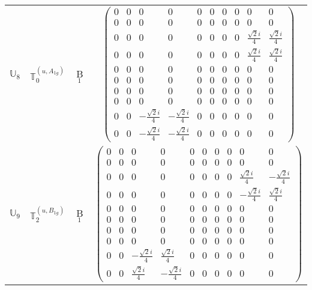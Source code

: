 \documentclass[fleqn,10pt,landscape]{article}
\begin{document}
\begin{itemize}
\begin{center}
\begin{longtable}{c|c|c|c}
$ \mathbb{U}_{8} $ & $\mathbb{T}_{0}^{(u,A_{1g})}$ & B$_{1}$ & $\begin{pmatrix} 0 & 0 & 0 & 0 & 0 & 0 & 0 & 0 & 0 & 0 \\ 0 & 0 & 0 & 0 & 0 & 0 & 0 & 0 & 0 & 0 \\ 0 & 0 & 0 & 0 & 0 & 0 & 0 & 0 & \frac{\sqrt{2} i}{4} & \frac{\sqrt{2} i}{4} \\ 0 & 0 & 0 & 0 & 0 & 0 & 0 & 0 & \frac{\sqrt{2} i}{4} & \frac{\sqrt{2} i}{4} \\ 0 & 0 & 0 & 0 & 0 & 0 & 0 & 0 & 0 & 0 \\ 0 & 0 & 0 & 0 & 0 & 0 & 0 & 0 & 0 & 0 \\ 0 & 0 & 0 & 0 & 0 & 0 & 0 & 0 & 0 & 0 \\ 0 & 0 & 0 & 0 & 0 & 0 & 0 & 0 & 0 & 0 \\ 0 & 0 & - \frac{\sqrt{2} i}{4} & - \frac{\sqrt{2} i}{4} & 0 & 0 & 0 & 0 & 0 & 0 \\ 0 & 0 & - \frac{\sqrt{2} i}{4} & - \frac{\sqrt{2} i}{4} & 0 & 0 & 0 & 0 & 0 & 0 \end{pmatrix}$ \\
$ \mathbb{U}_{9} $ & $\mathbb{T}_{2}^{(u,B_{1g})}$ & B$_{1}$ & $\begin{pmatrix} 0 & 0 & 0 & 0 & 0 & 0 & 0 & 0 & 0 & 0 \\ 0 & 0 & 0 & 0 & 0 & 0 & 0 & 0 & 0 & 0 \\ 0 & 0 & 0 & 0 & 0 & 0 & 0 & 0 & \frac{\sqrt{2} i}{4} & - \frac{\sqrt{2} i}{4} \\ 0 & 0 & 0 & 0 & 0 & 0 & 0 & 0 & - \frac{\sqrt{2} i}{4} & \frac{\sqrt{2} i}{4} \\ 0 & 0 & 0 & 0 & 0 & 0 & 0 & 0 & 0 & 0 \\ 0 & 0 & 0 & 0 & 0 & 0 & 0 & 0 & 0 & 0 \\ 0 & 0 & 0 & 0 & 0 & 0 & 0 & 0 & 0 & 0 \\ 0 & 0 & 0 & 0 & 0 & 0 & 0 & 0 & 0 & 0 \\ 0 & 0 & - \frac{\sqrt{2} i}{4} & \frac{\sqrt{2} i}{4} & 0 & 0 & 0 & 0 & 0 & 0 \\ 0 & 0 & \frac{\sqrt{2} i}{4} & - \frac{\sqrt{2} i}{4} & 0 & 0 & 0 & 0 & 0 & 0 \end{pmatrix}$ \\ \hline

\end{longtable}
\end{center}
\end{itemize}
\end{document}
